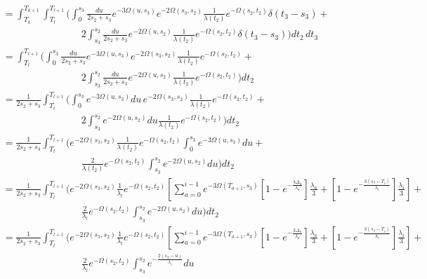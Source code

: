\documentclass{article}
\begin{document}
\begin{align*}
    &=\int_{T_k}^{T_{k+1}}\int_{T_l}^{T_{l+1}}\Bigg(
    \int_0^{s_3}\frac{du}{2s_2+s_3}e^{-3\Omega(u,s_3)}e^{-2\Omega(s_3,s_2)}\frac{1}{\lambda(t_2)}e^{-\Omega(s_2,t_2)}\delta(t_3-s_3)+\\
    &\qquad\qquad\qquad\qquad
    2\int_{s_3}^{s_2}\frac{du}{2s_2+s_3}e^{-2\Omega(u,s_2)}\frac{1}{\lambda(t_2)}e^{-\Omega(s_2,t_2)}\delta(t_3-s_3)
    \Bigg)dt_2\,dt_3\\
    &=\int_{T_l}^{T_{l+1}}\Bigg(
    \int_0^{s_3}\frac{du}{2s_2+s_3}e^{-3\Omega(u,s_3)}e^{-2\Omega(s_3,s_2)}\frac{1}{\lambda(t_2)}e^{-\Omega(s_2,t_2)}+\\
    &\qquad\qquad\qquad\qquad
    2\int_{s_3}^{s_2}\frac{du}{2s_2+s_3}e^{-2\Omega(u,s_2)}\frac{1}{\lambda(t_2)}e^{-\Omega(s_2,t_2)}
    \Bigg)dt_2\\
    &=\frac{1}{2s_2+s_3}\int_{T_l}^{T_{l+1}}\Bigg(
    \int_0^{s_3}e^{-3\Omega(u,s_3)}du\,e^{-2\Omega(s_3,s_2)}\frac{1}{\lambda(t_2)}e^{-\Omega(s_2,t_2)}+\\
    &\qquad\qquad\qquad\qquad
    2\int_{s_3}^{s_2}e^{-2\Omega(u,s_2)}du\frac{1}{\lambda(t_2)}e^{-\Omega(s_2,t_2)}
    \Bigg)dt_2\\
    &=\frac{1}{2s_2+s_3}\int_{T_l}^{T_{l+1}}\Bigg(
    e^{-2\Omega(s_3,s_2)}\frac{1}{\lambda(t_2)}e^{-\Omega(s_2,t_2)}\int_0^{s_3}e^{-3\Omega(u,s_3)}du+\\
    &\qquad\qquad\qquad\qquad
    \frac{2}{\lambda(t_2)}e^{-\Omega(s_2,t_2)}\int_{s_3}^{s_2}e^{-2\Omega(u,s_2)}du
    \Bigg)dt_2\\
    &=\frac{1}{2s_2+s_3}\int_{T_l}^{T_{l+1}}\Bigg(
    e^{-2\Omega(s_3,s_2)}\frac{1}{\lambda_l}e^{-\Omega(s_2,t_2)}\left[\sum_{a=0}^{i-1} e^{-3\Omega(T_{a+1},s_3)}
    \left[1-e^{-\frac{3 \Delta_a}{\lambda_a}}\right]\frac{\lambda_a}{3}+
    \left[1-e^{-\frac{3 \left(s_3-T_{i}\right)}{\lambda_{i}}}\right]\frac{\lambda_{i}}{3}\right]+\\
    &\qquad\qquad\qquad\qquad
    \frac{2}{\lambda_l}e^{-\Omega(s_2,t_2)}\int_{s_3}^{s_2}e^{-2\Omega(u,s_2)}du
    \Bigg)dt_2\\
    &=\frac{1}{2s_2+s_3}\int_{T_l}^{T_{l+1}}\Bigg(
    e^{-2\Omega(s_3,s_2)}\frac{1}{\lambda_l}e^{-\Omega(s_2,t_2)}\left[\sum_{a=0}^{i-1} e^{-3\Omega(T_{a+1},s_3)}
    \left[1-e^{-\frac{3 \Delta_a}{\lambda_a}}\right]\frac{\lambda_a}{3}+
    \left[1-e^{-\frac{3 \left(s_3-T_{i}\right)}{\lambda_{i}}}\right]\frac{\lambda_{i}}{3}\right]+\\
    &\qquad\qquad\qquad\qquad
    \frac{2}{\lambda_l}e^{-\Omega(s_2,t_2)}\int_{s_3}^{s_2}e^{-\frac{2(s_2-u)}{\lambda_i}}du

\end{align*}
\end{document}
